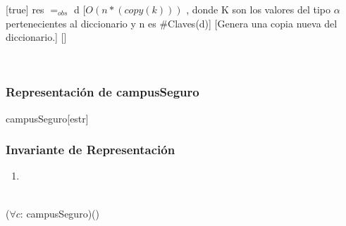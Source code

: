 [true]
{res $=_{obs}$ d}
[$O(n*(copy(k)))$ , donde K son los valores del tipo $\alpha$ pertenecientes al diccionario y n es $\#$Claves(d)]
[Genera una copia nueva del diccionario.]
[]

~
\pagebreak

\subsubsection{Representación de campusSeguro}

\begin{Estructura}{campusSeguro}[estr]
	\begin{Tupla}[estr]
	\end{Tupla}

\end{Estructura}

\subsubsection{Invariante de Representación}

\renewcommand{\labelenumi}{(\Roman{enumi})}

\begin{enumerate}
	\item

\end{enumerate}

\pagebreak

\Rep[estr][e]
	\\
	($\forall c$: campusSeguro)()

